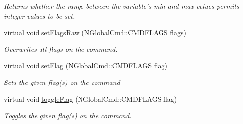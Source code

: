 \begin{DoxyCompactItemize}
\begin{DoxyCompactList}\small\item\em Returns whether the range between the variable's min and max values permits integer values to be set. \end{DoxyCompactList}\item 
virtual void \hyperlink{class_con_var_af64d152bd5371b964b06795ef6532f76}{set\-Flags\-Raw} (N\-Global\-Cmd\-::\-C\-M\-D\-F\-L\-A\-G\-S flags)
\begin{DoxyCompactList}\small\item\em Overwrites all flags on the command. \end{DoxyCompactList}\item 
virtual void \hyperlink{class_con_var_a3603e63a9f9798e0009e3e58edcfd277}{set\-Flag} (N\-Global\-Cmd\-::\-C\-M\-D\-F\-L\-A\-G\-S flag)
\begin{DoxyCompactList}\small\item\em Sets the given flag(s) on the command. \end{DoxyCompactList}\item 
virtual void \hyperlink{class_con_var_aadc6d792abbb1e4b431611d20b8db595}{toggle\-Flag} (N\-Global\-Cmd\-::\-C\-M\-D\-F\-L\-A\-G\-S flag)
\begin{DoxyCompactList}\small\item\em Toggles the given flag(s) on the command. \end{DoxyCompactList}\end{DoxyCompactItemize}
